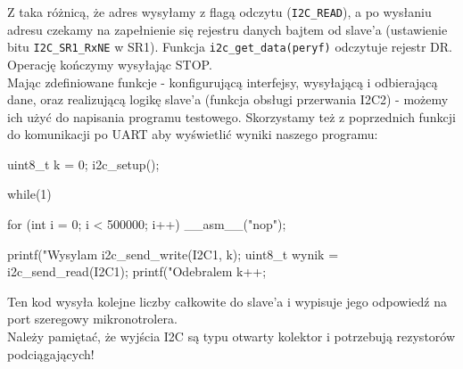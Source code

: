 \documentclass{pdfBooklets}
\begin{document}
Z taka różnicą, że adres wysyłamy z flagą odczytu (\Verb$I2C_READ$), a po wysłaniu adresu czekamy na zapełnienie się rejestru danych bajtem od
slave'a (ustawienie bitu \Verb$I2C_SR1_RxNE$ w SR1). Funkcja \Verb$i2c_get_data(peryf)$ odczytuje rejestr DR. Operację kończymy wysyłając STOP. \\

Mając zdefiniowane funkcje - konfigurującą interfejsy, wysyłającą i odbierającą dane, oraz realizującą logikę slave'a (funkcja obsługi przerwania
I2C2) - możemy ich użyć do napisania programu testowego. Skorzystamy też z poprzednich funkcji do komunikacji po UART aby wyświetlić wyniki naszego
programu:

\begin{CodeFrame*}[c]{}
  uint8_t k = 0;
  i2c_setup();

  while(1){
    for (int i = 0; i < 500000; i++) __asm__("nop");
    
    printf("Wysylam %
    i2c_send_write(I2C1, k);    
    uint8_t wynik = i2c_send_read(I2C1);
    printf("Odebralem %
    k++;
  }
\end{CodeFrame*}

Ten kod wysyła kolejne liczby całkowite do slave'a i wypisuje jego odpowiedź na port szeregowy mikronotrolera.\\

Należy pamiętać, że wyjścia I2C są typu otwarty kolektor i potrzebują rezystorów podciągających!

\end{document}
